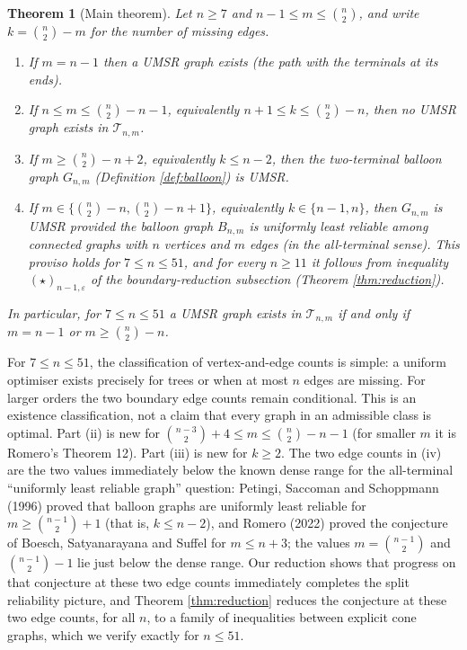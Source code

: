 \documentclass[
  11pt,
]{article}
\newtheorem{theorem}{Theorem}[section]
\theoremstyle{definition}
\theoremstyle{remark}
\begin{document}
\begin{theorem}[Main theorem]\label{thm:main}
Let $n\ge 7$ and $n-1\le m\le\binom n2$, and write $k=\binom n2-m$ for the number of missing edges.
\begin{enumerate}
\item[(i)] If $m=n-1$ then a UMSR graph exists (the path with the terminals at its ends).
\item[(ii)] If $n\le m\le\binom n2-n-1$, equivalently $n+1\le k\le\binom n2-n$, then no UMSR graph exists in $\mathcal T_{n,m}$.
\item[(iii)] If $m\ge\binom n2-n+2$, equivalently $k\le n-2$, then the two-terminal balloon graph $G_{n,m}$ (Definition \ref{def:balloon}) is UMSR.
\item[(iv)] If $m\in\{\binom n2-n,\binom n2-n+1\}$, equivalently $k\in\{n-1,n\}$, then $G_{n,m}$ is UMSR provided the balloon graph $B_{n,m}$ is uniformly least reliable among connected graphs with $n$ vertices and $m$ edges (in the all-terminal sense). This proviso holds for $7\le n\le 51$, and for every $n\ge 11$ it follows from inequality $(\star)_{n-1,\varepsilon}$ of the boundary-reduction subsection (Theorem \ref{thm:reduction}).
\end{enumerate}
In particular, for $7\le n\le 51$ a UMSR graph exists in $\mathcal T_{n,m}$ if and only if $m=n-1$ or $m\ge\binom n2-n$.
\end{theorem}

For \(7\le n\le51\), the classification of vertex-and-edge counts is
simple: a uniform optimiser exists precisely for trees or when at most
\(n\) edges are missing. For larger orders the two boundary edge counts
remain conditional. This is an existence classification, not a claim
that every graph in an admissible class is optimal. Part (ii) is new for
\(\binom{n-3}2+4\le m\le\binom n2-n-1\) (for smaller \(m\) it is
Romero's Theorem 12). Part (iii) is new for \(k\ge 2\). The two edge
counts in (iv) are the two values immediately below the known dense
range for the all-terminal ``uniformly least reliable graph'' question:
Petingi, Saccoman and Schoppmann (1996) proved that balloon graphs are
uniformly least reliable for \(m\ge\binom{n-1}2+1\) (that is,
\(k\le n-2\)), and Romero (2022) proved the conjecture of Boesch,
Satyanarayana and Suffel for \(m\le n+3\); the values \(m=\binom{n-1}2\)
and \(\binom{n-1}2-1\) lie just below the dense range. Our reduction
shows that progress on that conjecture at these two edge counts
immediately completes the split reliability picture, and Theorem
\ref{thm:reduction} reduces the conjecture at these two edge counts, for
all \(n\), to a family of inequalities between explicit cone graphs,
which we verify exactly for \(n\le51\).
\end{document}
